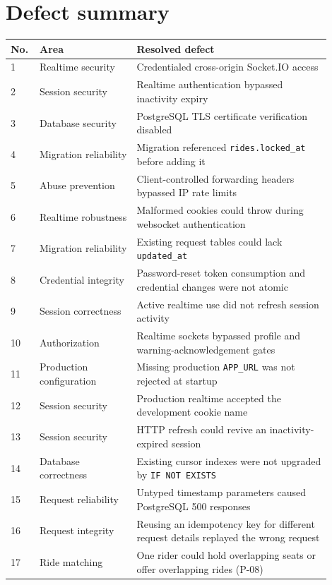 \documentclass[10pt]{article}
\begin{document}
\section{Defect summary}
\small
\begin{longtable}{@{}p{0.055\linewidth}p{0.28\linewidth}p{0.57\linewidth}@{}}
\toprule
\textbf{No.} & \textbf{Area} & \textbf{Resolved defect} \\
\midrule
1 & Realtime security & Credentialed cross-origin Socket.IO access \\
2 & Session security & Realtime authentication bypassed inactivity expiry \\
3 & Database security & PostgreSQL TLS certificate verification disabled \\
4 & Migration reliability & Migration referenced \texttt{rides.locked\_at} before adding it \\
5 & Abuse prevention & Client-controlled forwarding headers bypassed IP rate limits \\
6 & Realtime robustness & Malformed cookies could throw during websocket authentication \\
7 & Migration reliability & Existing request tables could lack \texttt{updated\_at} \\
8 & Credential integrity & Password-reset token consumption and credential changes were not atomic \\
9 & Session correctness & Active realtime use did not refresh session activity \\
10 & Authorization & Realtime sockets bypassed profile and warning-acknowledgement gates \\
11 & Production configuration & Missing production \texttt{APP\_URL} was not rejected at startup \\
12 & Session security & Production realtime accepted the development cookie name \\
13 & Session security & HTTP refresh could revive an inactivity-expired session \\
14 & Database correctness & Existing cursor indexes were not upgraded by \texttt{IF NOT EXISTS} \\
15 & Request reliability & Untyped timestamp parameters caused PostgreSQL 500 responses \\
16 & Request integrity & Reusing an idempotency key for different request details replayed the wrong request \\
17 & Ride matching & One rider could hold overlapping seats or offer overlapping rides (P-08) \\

\end{longtable}
\end{document}
